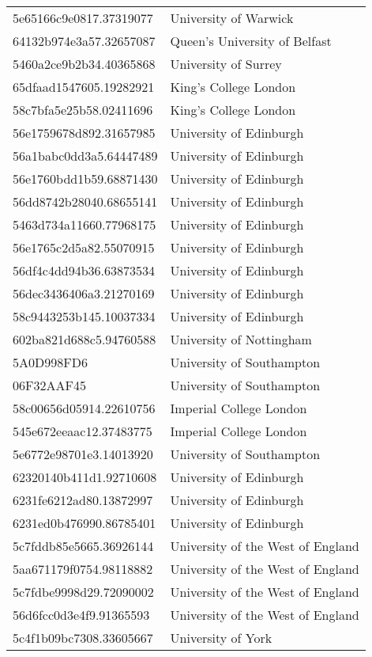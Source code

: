 \begin{tabular}{ll}
5e65166c9e0817.37319077 & University of Warwick \\
64132b974e3a57.32657087 & Queen's University of Belfast \\
5460a2ce9b2b34.40365868 & University of Surrey \\
65dfaad1547605.19282921 & King's College London \\
58c7bfa5e25b58.02411696 & King's College London \\
56e1759678d892.31657985 & University of Edinburgh \\
56a1babc0dd3a5.64447489 & University of Edinburgh \\
56e1760bdd1b59.68871430 & University of Edinburgh \\
56dd8742b28040.68655141 & University of Edinburgh \\
5463d734a11660.77968175 & University of Edinburgh \\
56e1765c2d5a82.55070915 & University of Edinburgh \\
56df4c4dd94b36.63873534 & University of Edinburgh \\
56dec3436406a3.21270169 & University of Edinburgh \\
58c9443253b145.10037334 & University of Edinburgh \\
602ba821d688c5.94760588 & University of Nottingham \\
5A0D998FD6 & University of Southampton \\
06F32AAF45 & University of Southampton \\
58c00656d05914.22610756 & Imperial College London \\
545e672eeaac12.37483775 & Imperial College London \\
5e6772e98701e3.14013920 & University of Southampton \\
62320140b411d1.92710608 & University of Edinburgh \\
6231fe6212ad80.13872997 & University of Edinburgh \\
6231ed0b476990.86785401 & University of Edinburgh \\
5c7fddb85e5665.36926144 & University of the West of England \\
5aa671179f0754.98118882 & University of the West of England \\
5c7fdbe9998d29.72090002 & University of the West of England \\
56d6fcc0d3e4f9.91365593 & University of the West of England \\
5c4f1b09bc7308.33605667 & University of York \\

\end{tabular}
